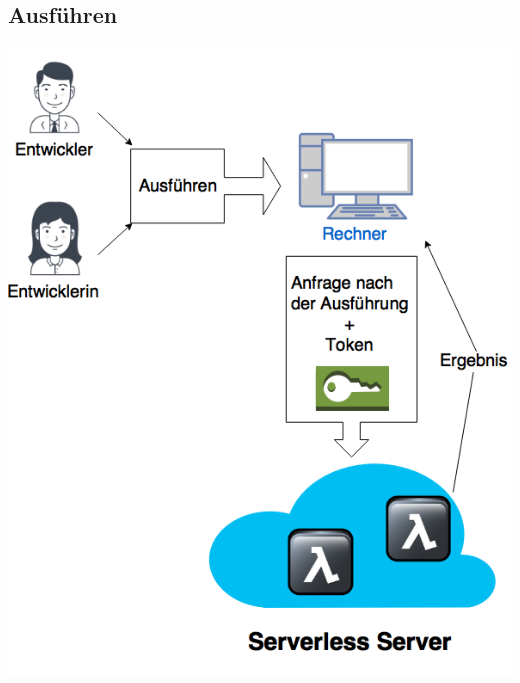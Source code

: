 \documentclass[a4paper,20pt,oneside]{book}
\begin{document}
\subsection{Ausführen}
\hspace{1cm}
\begin{center}
\includegraphics[width=13 cm]{Ausfuhren.png}
\end{center}

\pagebreak
\end{document}
